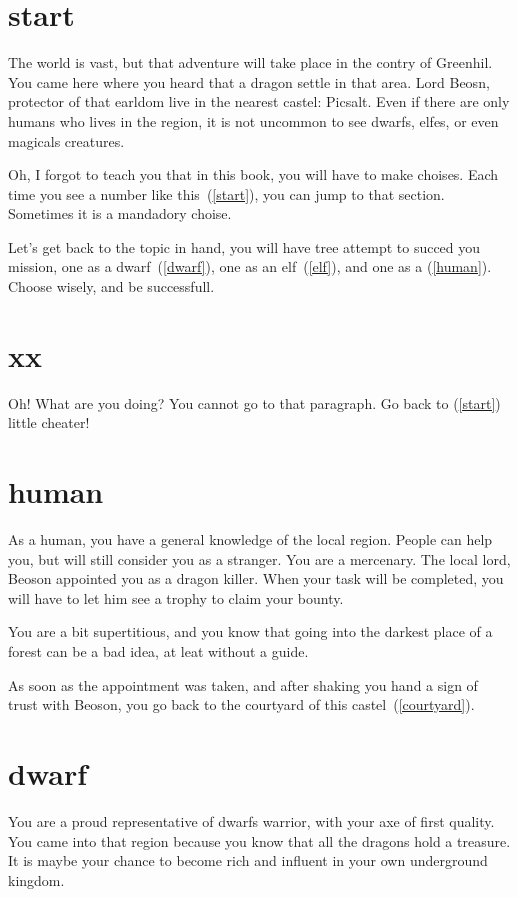 \section{start}

The world is vast, but that adventure will take place in
the contry of Greenhil. You came here where you heard that a dragon settle in
that area. Lord Beosn, protector of that earldom live in the nearest castel:
Picsalt. Even if there are only humans who lives in the region, it is not
uncommon to see dwarfs, elfes, or even magicals creatures.

Oh, I forgot to teach you that in this book, you will have to make choises. Each
time you see a number like this~(\ref{start}), you can jump to that section.
Sometimes it is a mandadory choise.

Let's get back to the topic in hand, you will have tree attempt to succed you
mission, one as a dwarf~(\ref{dwarf}), one as an elf~(\ref{elf}), and one as a
(\ref{human}). Choose wisely, and be successfull.

\section{xx}

Oh! What are you doing? You cannot go to that paragraph. Go back to
(\ref{start}) little cheater!

\section{human}

As a human, you have a general knowledge of the local region. People can help
you, but will still consider you as a stranger. You are a mercenary. The local
lord, Beoson appointed you as a dragon killer. When your task will be completed,
you will have to let him see a trophy to claim your bounty.

You are a bit supertitious, and you know that going into the darkest place
of a forest can be a bad idea, at leat without a guide.

As soon as the appointment was taken, and after shaking you hand a sign of trust
with Beoson, you go back to the courtyard of this castel~(\ref{courtyard}).

\section{dwarf}

You are a proud representative of dwarfs warrior, with your axe of first
quality. You came into that region because you know that all the dragons hold a
treasure. It is maybe your chance to become rich and influent in your own
underground kingdom.

